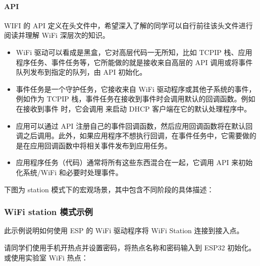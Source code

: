 \documentclass[a4paper,12pt,english]{sphinxmanual}
\begin{document}
{{\paragraph{API}
\label{\detokenize{exp-esp32/wifi/station:api}}
\sphinxAtStartPar
WIFI 的 API 定义在头文件中，希望深入了解的同学可以自行前往该头文件进行阅读并理解 WiFi 深层次的知识。
\begin{itemize}
\item {} 
\sphinxAtStartPar
WiFi 驱动可以看成是黑盒，它对高层代码一无所知，比如 TCPIP 栈、应用程序任务、事件任务等，它所能做的就是接收来自高层的 API 调用或将事件队列发布到指定的队列，由 API  初始化。

\item {} 
\sphinxAtStartPar
事件任务是一个守护任务，它接收来自 WiFi 驱动程序或其他子系统的事件，例如作为 TCPIP 栈，事件任务在接收到事件时会调用默认的回调函数。例如在接收到事件  时，它会调用  来启动 DHCP 客户端在它的默认处理程序中。

\item {} 
\sphinxAtStartPar
应用可以通过 API 注册自己的事件回调函数，然后应用回调函数将在默认回调之后调用。此外，如果应用程序不想执行回调，在事件任务中，它需要做的是在应用回调函数中将相关事件发布到应用任务。

\item {} 
\sphinxAtStartPar
应用程序任务（代码）通常将所有这些东西混合在一起，它调用 API 来初始化系统/WiFi 和必要时处理事件。

\end{itemize}

\sphinxAtStartPar
下图为 station 模式下的宏观场景，其中包含不同阶段的具体描述：

\sphinxAtStartPar
{}


\subsubsection{Wi\sphinxhyphen{}Fi station 模式示例}
\label{\detokenize{exp-esp32/wifi/station:wi-fi-station}}
\sphinxAtStartPar
此示例说明如何使用 ESP 的 Wi\sphinxhyphen{}Fi 驱动程序将 Wi\sphinxhyphen{}Fi Station 连接到接入点。

\sphinxAtStartPar
请同学们使用手机开热点并设置密码，将热点名称和密码输入到 ESP32 初始化。或使用实验室 WiFi 热点：

}}
\end{document}
